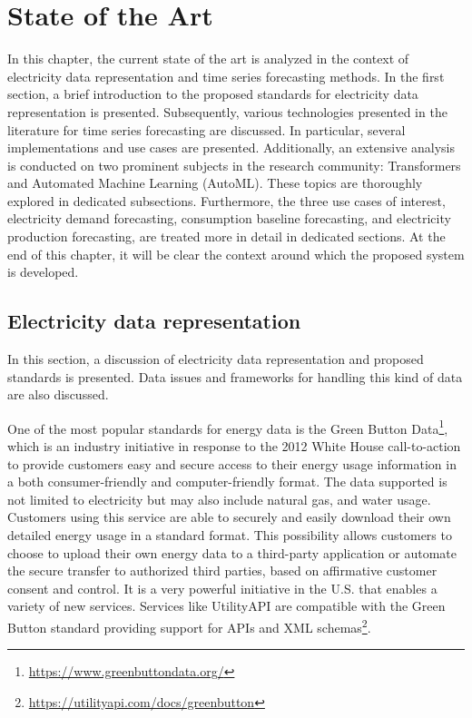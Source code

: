 \chapter{State of the Art}
\label{cha:soa}
\vspace{0.4 cm}

In this chapter, the current state of the art is analyzed in the context of electricity data representation and time series forecasting methods.
In the first section, a brief introduction to the proposed standards for electricity data representation is presented.
Subsequently, various technologies presented in the literature for time series forecasting are discussed.
In particular, several implementations and use cases are presented.
Additionally, an extensive analysis is conducted on two prominent subjects in the research community: Transformers and Automated Machine Learning (AutoML).
These topics are thoroughly explored in dedicated subsections.
Furthermore, the three use cases of interest, electricity demand forecasting, consumption baseline forecasting, and electricity production forecasting, are treated more in detail in dedicated sections.
At the end of this chapter, it will be clear the context around which the proposed system is developed.


\section{Electricity data representation}
\label{sec:data}
\vspace{0.2 cm}

In this section, a discussion of electricity data representation and proposed standards is presented.
Data issues and frameworks for handling this kind of data are also discussed.

One of the most popular standards for energy data is the Green Button Data\footnote{ \url{https://www.greenbuttondata.org/} }, which is an industry initiative in response to the 2012 White House call-to-action to provide customers easy and secure access to their energy usage information in a both consumer-friendly and computer-friendly format.
The data supported is not limited to electricity but may also include natural gas, and water usage.
Customers using this service are able to securely and easily download their own detailed energy usage in a standard format.
This possibility allows customers to choose to upload their own energy data to a third-party application or automate the secure transfer to authorized third parties, based on affirmative customer consent and control.
It is a very powerful initiative in the U.S. that enables a variety of new services.
Services like UtilityAPI are compatible with the Green Button standard providing support for APIs and XML schemas\footnote{ \url{https://utilityapi.com/docs/greenbutton} }.


